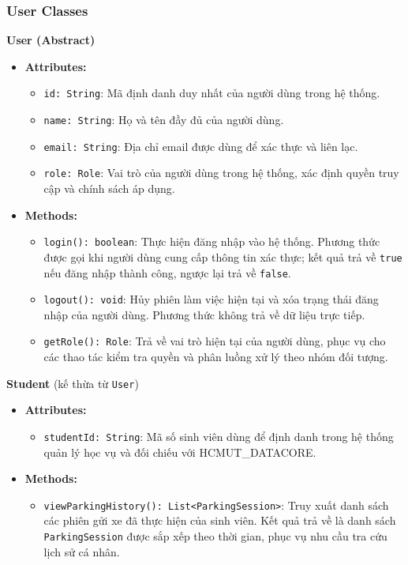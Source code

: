 \subsubsection{User Classes}

\noindent\textbf{User (Abstract)}
\begin{itemize}
	\item \textbf{Attributes:}
	\begin{itemize}
		\item \texttt{id: String}: Mã định danh duy nhất của người dùng trong hệ thống.
		\item \texttt{name: String}: Họ và tên đầy đủ của người dùng.
		\item \texttt{email: String}: Địa chỉ email được dùng để xác thực và liên lạc.
		\item \texttt{role: Role}: Vai trò của người dùng trong hệ thống, xác định quyền truy cập và chính sách áp dụng.
	\end{itemize}
	\item \textbf{Methods:}
	\begin{itemize}
		\item \texttt{login(): boolean}: Thực hiện đăng nhập vào hệ thống. Phương thức được gọi khi người dùng cung cấp thông tin xác thực; kết quả trả về \texttt{true} nếu đăng nhập thành công, ngược lại trả về \texttt{false}.
		\item \texttt{logout(): void}: Hủy phiên làm việc hiện tại và xóa trạng thái đăng nhập của người dùng. Phương thức không trả về dữ liệu trực tiếp.
		\item \texttt{getRole(): Role}: Trả về vai trò hiện tại của người dùng, phục vụ cho các thao tác kiểm tra quyền và phân luồng xử lý theo nhóm đối tượng.
	\end{itemize}
\end{itemize}

\noindent\textbf{Student} (kế thừa từ \texttt{User})
\begin{itemize}
	\item \textbf{Attributes:}
	\begin{itemize}
		\item \texttt{studentId: String}: Mã số sinh viên dùng để định danh trong hệ thống quản lý học vụ và đối chiếu với \mbox{HCMUT\_DATACORE}.
	\end{itemize}
	\item \textbf{Methods:}
	\begin{itemize}
		\item \texttt{viewParkingHistory(): List<ParkingSession>}: Truy xuất danh sách các phiên gửi xe đã thực hiện của sinh viên. Kết quả trả về là danh sách \texttt{ParkingSession} được sắp xếp theo thời gian, phục vụ nhu cầu tra cứu lịch sử cá nhân.
	\end{itemize}
\end{itemize}

